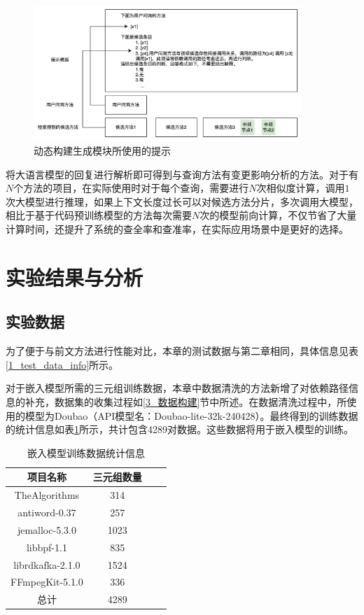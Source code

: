 \begin{figure}[htbp]
\centering
\includegraphics[width = 0.9\textwidth]{figures/提示词填充.jpg}
\caption{动态构建生成模块所使用的提示}
\label{2_推理prompt}
\end{figure}


将大语言模型的回复进行解析即可得到与查询方法有变更影响分析的方法。对于有$N$个方法的项目，在实际使用时对于每个查询，需要进行$N$次相似度计算，调用$1$次大模型进行推理，如果上下文长度过长可以对候选方法分片，多次调用大模型，相比于基于代码预训练模型的方法每次需要$N$次的模型前向计算，不仅节省了大量计算时间，还提升了系统的查全率和查准率，在实际应用场景中是更好的选择。


\section{实验结果与分析}

\subsection{实验数据}

为了便于与前文方法进行性能对比，本章的测试数据与第二章相同，具体信息见表\ref{1_test_data_info}所示。

对于嵌入模型所需的三元组训练数据，本章中数据清洗的方法新增了对依赖路径信息的补充，数据集的收集过程如\ref{3_数据构建}节中所述。在数据清洗过程中，所使用的模型为Doubao（API模型名：Doubao-lite-32k-240428）。最终得到的训练数据的统计信息如表\ref{1_数据集统计信息}所示，共计包含4289对数据。这些数据将用于嵌入模型的训练。


\begin{table}[htbp]
\caption{嵌入模型训练数据统计信息}
\label{1_数据集统计信息}
\vspace{0.5em}\centering\wuhao
\begin{tabular}{cccc}
\toprule
项目名称 & 三元组数量 \\
\midrule
TheAlgorithms    & 314   \\
antiword-0.37    & 257   \\
jemalloc-5.3.0   & 1023   \\
libbpf-1.1       & 835   \\
librdkafka-2.1.0 & 1524  \\
FFmpegKit-5.1.0  & 336   \\ 
总计              & 4289  \\
\bottomrule
\end{tabular}
\end{table}


